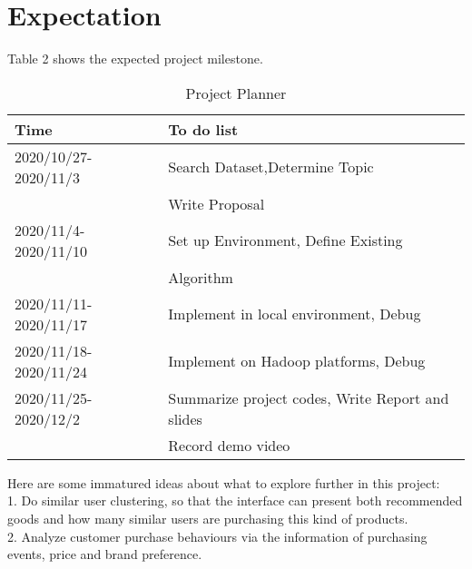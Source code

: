 \documentclass[sigconf,authordraft]{acmart}
\begin{document}
\section{Expectation}
Table 2 shows the expected project milestone.
\begin{table}[H]
    \centering
    \caption{Project Planner}
    \label{Table 2}
\begin{tabular}{ll}
\hline
Time                  & To do list                                      \\
\hline
2020/10/27-2020/11/3  & Search Dataset,Determine Topic                \\
                      & Write Proposal                                \\
2020/11/4-2020/11/10  & Set up Environment, Define Existing            \\
                      & Algorithm                                       \\
2020/11/11-2020/11/17 & Implement in local environment, Debug              \\
2020/11/18-2020/11/24 & Implement on Hadoop platforms, Debug                  \\
2020/11/25-2020/12/2  & Summarize project codes, Write Report and slides          \\
                      & Record demo video                             \\
\hline
\end{tabular}
\end{table}
\noindent Here are some immatured ideas about what to explore further in this project:\\
1. Do similar user clustering, so that the interface can present both recommended goods and how many similar users are purchasing this kind of products.\\
2. Analyze customer purchase behaviours via the information of purchasing events, price and brand preference.
\medskip



\end{document}
